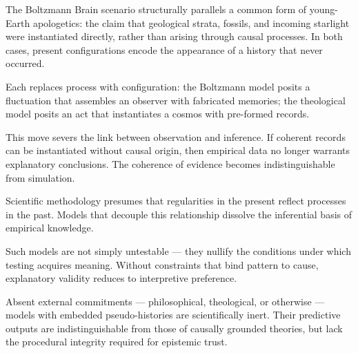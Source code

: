 \newpage

\begin{commentary}
The Boltzmann Brain scenario structurally parallels a common form of young-Earth apologetics: the claim that geological strata, fossils, and incoming starlight were instantiated directly, rather than arising through causal processes. In both cases, present configurations encode the appearance of a history that never occurred.

Each replaces process with configuration: the Boltzmann model posits a fluctuation that assembles an observer with fabricated memories; the theological model posits an act that instantiates a cosmos with pre-formed records.

This move severs the link between observation and inference. If coherent records can be instantiated without causal origin, then empirical data no longer warrants explanatory conclusions. The coherence of evidence becomes indistinguishable from simulation.

Scientific methodology presumes that regularities in the present reflect processes in the past. Models that decouple this relationship dissolve the inferential basis of empirical knowledge.

Such models are not simply untestable — they nullify the conditions under which testing acquires meaning. Without constraints that bind pattern to cause, explanatory validity reduces to interpretive preference.

Absent external commitments — philosophical, theological, or otherwise — models with embedded pseudo-histories are scientifically inert. Their predictive outputs are indistinguishable from those of causally grounded theories, but lack the procedural integrity required for epistemic trust.
\end{commentary}

